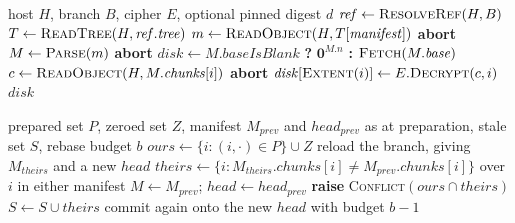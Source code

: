 \documentclass[journal,10pt]{IEEEtran}
\begin{document}
\begin{algorithm}[!htb]
\caption{Restore. Note the loop bound.}
\label{alg:restore}
\begin{algorithmic}[1]
\Require host $H$, branch $B$, cipher $E$, optional pinned digest $d$
\State $\mathit{ref} \gets \textsc{ResolveRef}(H, B)$
\State $T \gets \textsc{ReadTree}(H, \mathit{ref}.\mathit{tree})$
\State $m \gets \textsc{ReadObject}(H, T[\mathit{manifest}])$
  \State \textbf{abort} 
\EndIf
\State $M \gets \textsc{Parse}(m)$
  \State \textbf{abort} 
\EndIf
\State $\mathit{disk} \gets M.\mathit{baseIsBlank}$ \textbf{?} $\mathbf{0}^{M.n}$ \textbf{:}
  $\textsc{Fetch}(M.\mathit{base})$
 
  \State $c \gets \textsc{ReadObject}(H, M.\mathit{chunks}[i])$
  \Statex \hfill {}
    \State \textbf{abort} 
  \EndIf
  \State $\mathit{disk}[\textsc{Extent}(i)] \gets E.\textsc{Decrypt}(c, i)$
  \Statex \hfill {}
\EndFor
\State \Return $\mathit{disk}$
\end{algorithmic}
\end{algorithm}

\begin{algorithm}[!htb]
\caption{Conflict resolution, after a refused reference update.}
\label{alg:conflict}
\begin{algorithmic}[1]
\Require prepared set $P$, zeroed set $Z$, manifest $M_{\mathit{prev}}$ and
  $\mathit{head}_{\mathit{prev}}$ as at preparation, stale set $S$, rebase budget $b$
\State $\mathit{ours} \gets \{i : (i,\cdot) \in P\} \cup Z$
\State reload the branch, giving $M_{\mathit{theirs}}$ and a new $\mathit{head}$
\State $\mathit{theirs} \gets \{i : M_{\mathit{theirs}}.\mathit{chunks}[i] \neq
  M_{\mathit{prev}}.\mathit{chunks}[i]\}$ over $i$ in either manifest
  \Statex \hfill {}
  \State $M \gets M_{\mathit{prev}}$; $\mathit{head} \gets \mathit{head}_{\mathit{prev}}$
  \Statex \hfill {}
  \State \textbf{raise} \textsc{Conflict}$(\mathit{ours} \cap \mathit{theirs})$
  \Statex \hfill {}
\EndIf
\State $S \gets S \cup \mathit{theirs}$ 
\State \Return commit again onto the new $\mathit{head}$ with budget $b - 1$
\end{algorithmic}
\end{algorithm}
\end{document}
